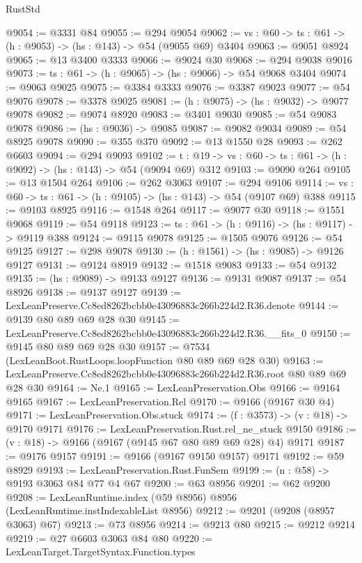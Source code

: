 \begin{lexlean}{RustStd}
\begin{coremodule}
@9054 := @3331 @84
@9055 := @294 @9054
@9062 := {vs : @60} -> {ts : @61} -> (h : @9053) -> (hs : @143) -> @54 (@9055 @69) @3404
@9063 := @9051 @8924
@9065 := @13 @3400 @3333
@9066 := @9024 @30
@9068 := @294 @9038 @9016
@9073 := {ts : @61} -> (h : @9065) -> (hs : @9066) -> @54 @9068 @3404
@9074 := @9063 @9025
@9075 := @3384 @3333
@9076 := @3387 @9023
@9077 := @54 @9076
@9078 := @3378 @9025
@9081 := (h : @9075) -> (hs : @9032) -> @9077 @9078
@9082 := @9074 @8920
@9083 := @3401 @9030
@9085 := @54 @9083 @9078
@9086 := (hs : @9036) -> @9085
@9087 := @9082 @9034
@9089 := @54 @8925 @9078
@9090 := @355 @370
@9092 := @13 @1550 @28
@9093 := @262 @6603
@9094 := @294 @9093
@9102 := {t : @19} -> {vs : @60} -> {ts : @61} -> (h : @9092) -> (hs : @143) -> @54 (@9094 @69) @312
@9103 := @9090 @264
@9105 := @13 @1504 @264
@9106 := @262 @3063
@9107 := @294 @9106
@9114 := {vs : @60} -> {ts : @61} -> (h : @9105) -> (hs : @143) -> @54 (@9107 @69) @388
@9115 := @9103 @8925
@9116 := @1548 @264
@9117 := @9077 @30
@9118 := @1551 @9068
@9119 := @54 @9118
@9123 := {ts : @61} -> (h : @9116) -> (hs : @9117) -> @9119 @388
@9124 := @9115 @9078
@9125 := @1505 @9076
@9126 := @54 @9125
@9127 := @298 @9078
@9130 := (h : @1561) -> (hs : @9085) -> @9126 @9127
@9131 := @9124 @8919
@9132 := @1518 @9083
@9133 := @54 @9132
@9135 := (hs : @9089) -> @9133 @9127
@9136 := @9131 @9087
@9137 := @54 @8926
@9138 := @9137 @9127
@9139 := LexLeanPreserve.Cc8ed8262bcbb0e43096883c266b224d2.R36.denote
@9144 := @9139 @80 @89 @69 @28 @30
@9145 := LexLeanPreserve.Cc8ed8262bcbb0e43096883c266b224d2.R36.__fits_0
@9150 := @9145 @80 @89 @69 @28 @30
@9157 := @7534 (LexLeanBoot.RustLoops.loopFunction @80 @89 @69 @28 @30)
@9163 := LexLeanPreserve.Cc8ed8262bcbb0e43096883c266b224d2.R36.root @80 @89 @69 @28 @30
@9164 := Ne.{1}
@9165 := LexLeanPreservation.Obs
@9166 := @9164 @9165
@9167 := LexLeanPreservation.Rel
@9170 := @9166 (@9167 @30 @4)
@9171 := LexLeanPreservation.Obs.stuck
@9174 := (f : @3573) -> (v : @18) -> @9170 @9171
@9176 := LexLeanPreservation.Rust.rel_ne_stuck @9150
@9186 := (v : @18) -> @9166 (@9167 (@9145 @67 @80 @89 @69 @28) @4) @9171
@9187 := @9176 @9157
@9191 := @9166 (@9167 @9150 @9157) @9171
@9192 := @59 @8929
@9193 := LexLeanPreservation.Rust.FunSem
@9199 := (n : @58) -> @9193 @3063 @84 @77 @4 @67
@9200 := @63 @8956
@9201 := @62 @9200
@9208 := LexLeanRuntime.index (@59 @8956) @8956 (LexLeanRuntime.instIndexableList @8956)
@9212 := @9201 (@9208 (@8957 @3063) @67)
@9213 := @73 @8956
@9214 := @9213 @80
@9215 := @9212 @9214
@9219 := @27 @6603 @3063 @84 @80
@9220 := LexLeanTarget.TargetSyntax.Function.types

\end{coremodule}
\end{lexlean}
